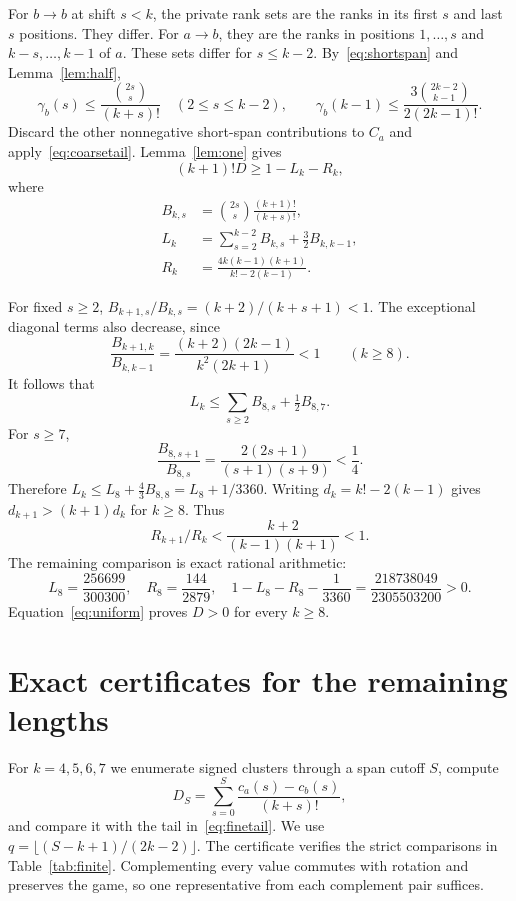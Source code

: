 \documentclass[11pt]{amsart}
\theoremstyle{remark}
\begin{document}
For $b\to b$ at shift $s<k$, the private rank sets are the ranks in its first $s$ and last $s$ positions. They differ. For $a\to b$, they are the ranks in positions $1,\ldots,s$ and $k-s,\ldots,k-1$ of $a$. These sets differ for $s\le k-2$. By~\eqref{eq:shortspan} and Lemma~\ref{lem:half},
\[
 \gamma_b(s)\le \frac{\binom{2s}{s}}{(k+s)!}\quad(2\le s\le k-2),\qquad
 \gamma_b(k-1)\le\frac{3\binom{2k-2}{k-1}}{2(2k-1)!}.
\]
Discard the other nonnegative short-span contributions to $C_a$ and apply~\eqref{eq:coarsetail}. Lemma~\ref{lem:one} gives
\begin{equation}\label{eq:uniform}
 (k+1)!D\ge 1-L_k-R_k,
\end{equation}
where
\begin{align*}
 B_{k,s}&=\binom{2s}{s}\frac{(k+1)!}{(k+s)!},\\
 L_k&=\sum_{s=2}^{k-2}B_{k,s}+\tfrac32 B_{k,k-1},\\
 R_k&=\frac{4k(k-1)(k+1)}{k!-2(k-1)}.
\end{align*}

For fixed $s\ge2$, $B_{k+1,s}/B_{k,s}=(k+2)/(k+s+1)<1$. The exceptional diagonal terms also decrease, since
\[
 \frac{B_{k+1,k}}{B_{k,k-1}}=
 \frac{(k+2)(2k-1)}{k^2(2k+1)}<1\qquad(k\ge8).
\]
It follows that
\[
 L_k\le\sum_{s\ge2}B_{8,s}+\tfrac12B_{8,7}.
\]
For $s\ge7$,
\[
 \frac{B_{8,s+1}}{B_{8,s}}=
 \frac{2(2s+1)}{(s+1)(s+9)}<\frac14.
\]
Therefore $L_k\le L_8+\frac43B_{8,8}=L_8+1/3360$.
Writing $d_k=k!-2(k-1)$ gives
$d_{k+1}>(k+1)d_k$ for $k\ge8$. Thus
\[
 R_{k+1}/R_k<\frac{k+2}{(k-1)(k+1)}<1.
\]
The remaining comparison is exact rational arithmetic:
\[
 L_8=\frac{256699}{300300},\quad R_8=\frac{144}{2879},\quad
 1-L_8-R_8-\frac1{3360}
 =\frac{218738049}{2305503200}>0.
\]
Equation~\eqref{eq:uniform} proves $D>0$ for every $k\ge8$.

\section{Exact certificates for the remaining lengths}

For $k=4,5,6,7$ we enumerate signed clusters through a span cutoff $S$, compute
\[
 D_S=\sum_{s=0}^{S}\frac{c_a(s)-c_b(s)}{(k+s)!},
\]
and compare it with the tail in~\eqref{eq:finetail}. We use
$q=\lfloor(S-k+1)/(2k-2)\rfloor$. The certificate verifies the strict comparisons in Table~\ref{tab:finite}. Complementing every value commutes with rotation and preserves the game, so one representative from each complement pair suffices.
\end{document}
